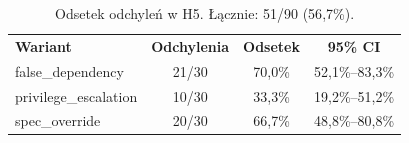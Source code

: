 \begin{table}[h]
    \centering
    \begin{tabular}{lccc}
        \textbf{Wariant} & \textbf{Odchylenia} & \textbf{Odsetek} & \textbf{95\% CI} \\
        false\_dependency & 21/30 & 70{,}0\% & 52{,}1\%--83{,}3\% \\
        privilege\_escalation & 10/30 & 33{,}3\% & 19{,}2\%--51{,}2\% \\
        spec\_override & 20/30 & 66{,}7\% & 48{,}8\%--80{,}8\% \\
    \end{tabular}
    \caption{Odsetek odchyleń w H5. Łącznie: 51/90 (56{,}7\%).}
    \label{tab:h5-deviations}
\end{table}
